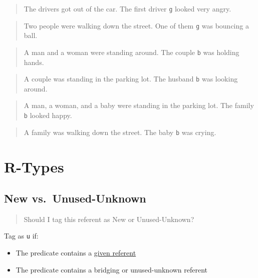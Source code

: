 \documentclass[
]{book}
\providecommand{\tightlist}{%
  \setlength{\itemsep}{0pt}\setlength{\parskip}{0pt}}
\begin{document}
\begin{quote}
The drivers got out of the car.
The first driver \texttt{g} looked very angry.
\end{quote}

\begin{quote}
Two people were walking down the street.
One of them \texttt{g} was bouncing a ball.
\end{quote}

\begin{quote}
A man and a woman were standing around.
The couple \texttt{b} was holding hands.
\end{quote}

\begin{quote}
A couple was standing in the parking lot.
The husband \texttt{b} was looking around.
\end{quote}

\begin{quote}
A man, a woman, and a baby were standing in the parking lot.
The family \texttt{b} looked happy.
\end{quote}

\begin{quote}
A family was walking down the street.
The baby \texttt{b} was crying.
\end{quote}

\hypertarget{r-types}{%
\section{R-Types}\label{r-types}}

\hypertarget{new-vs.-unused-unknown}{%
\subsection{New vs.~Unused-Unknown}\label{new-vs.-unused-unknown}}

\begin{quote}
Should I tag this referent as New or Unused-Unknown?
\end{quote}

Tag as \texttt{u} if:

\begin{itemize}
\tightlist
\item
  The predicate contains a \protect\hyperlink{phrases-containing-given-referents}{given referent}
\item
  The predicate contains a bridging or unused-unknown referent
\end{itemize}
\end{document}
